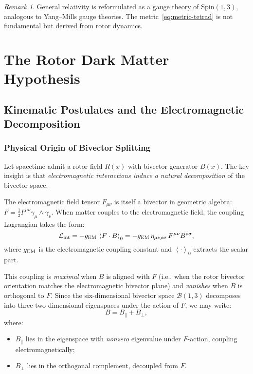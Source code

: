 \documentclass[11pt,a4paper]{article}
\numberwithin{equation}{section}
\theoremstyle{plain}
\theoremstyle{definition}
\theoremstyle{remark}
\newtheorem{remark}[theorem]{Remark}
\newcommand{\Spin}{\mathrm{Spin}}
\newcommand{\grade}[2]{\left\langle #1 \right\rangle_{#2}}
\newcommand{\bivec}{\mathcal{B}}            %
\newcommand{\Lag}{\mathcal{L}}              %
\begin{document}
\begin{remark}
General relativity is reformulated as a gauge theory of $\Spin(1,3)$, analogous to Yang--Mills gauge theories. The metric~\eqref{eq:metric-tetrad} is not fundamental but derived from rotor dynamics.
\end{remark}

\vspace{1em}

\section{The Rotor Dark Matter Hypothesis}\label{sec:rotor-dm}

\subsection{Kinematic Postulates and the Electromagnetic Decomposition}

\subsubsection{Physical Origin of Bivector Splitting}

Let spacetime admit a rotor field $R(x)$ with bivector generator $B(x)$. The key insight is that \emph{electromagnetic interactions induce a natural decomposition} of the bivector space.

The electromagnetic field tensor $F_{\mu\nu}$ is itself a bivector in geometric algebra: $F=\tfrac12 F^{\mu\nu}\gamma_\mu\wedge\gamma_\nu$. When matter couples to the electromagnetic field, the coupling Lagrangian takes the form:
\begin{equation}
\Lag_{\rm int} = -g_{\rm EM}\,\grade{F\cdot B}{0} = -g_{\rm EM}\,\eta_{\mu\nu\rho\sigma}\,F^{\mu\nu}B^{\rho\sigma},
\label{eq:em-coupling}
\end{equation}
where $g_{\rm EM}$ is the electromagnetic coupling constant and $\grade{\cdot}{0}$ extracts the scalar part.

This coupling is \emph{maximal} when $B$ is aligned with $F$ (i.e., when the rotor bivector orientation matches the electromagnetic bivector plane) and \emph{vanishes} when $B$ is orthogonal to $F$. Since the six-dimensional bivector space $\bivec(1,3)$ decomposes into three two-dimensional eigenspaces under the action of $F$, we may write:
\begin{equation}
B = B_\parallel + B_\perp,
\end{equation}
where:
\begin{itemize}[leftmargin=*]
  \item $B_\parallel$ lies in the eigenspace with \emph{nonzero} eigenvalue under $F$-action, coupling electromagnetically;
  \item $B_\perp$ lies in the orthogonal complement, decoupled from $F$.
\end{itemize}
\end{document}
